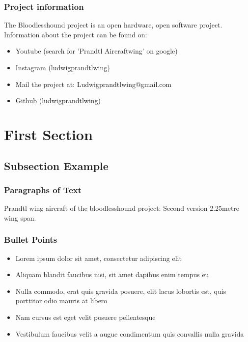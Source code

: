 \documentclass{beamer}
\begin{document}
\begin{frame}
\frametitle{Project information}

The Bloodlesshound project is an open hardware, open software project.  Information about the project can be found on:  

\begin{itemize}
\item Youtube (search for 'Prandtl Aircraftwing' on google)
\item Instagram (ludwigprandtlwing)
\item Mail the project at: Ludwigprandtlwing@gmail.com 
\item Github (ludwigprandtlwing)
\end{itemize}

\end{frame}




\section{First Section} %

\subsection{Subsection Example} %

\begin{frame}
\frametitle{Paragraphs of Text}
Prandtl wing aircraft of the bloodlesshound project:  Second version 2.25metre wing span.



\end{frame}


\begin{frame}
\frametitle{Bullet Points}
\begin{itemize}
\item Lorem ipsum dolor sit amet, consectetur adipiscing elit
\item Aliquam blandit faucibus nisi, sit amet dapibus enim tempus eu
\item Nulla commodo, erat quis gravida posuere, elit lacus lobortis est, quis porttitor odio mauris at libero
\item Nam cursus est eget velit posuere pellentesque
\item Vestibulum faucibus velit a augue condimentum quis convallis nulla gravida
\end{itemize}
\end{frame}
\end{document}

